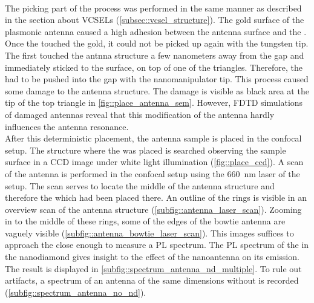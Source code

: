 					\\
					The picking part of the \pp process was performed in the same manner as described in the section about VCSELs (\cref{subsec::vcsel_structure}).
					The gold surface of the plasmonic antenna caused a high adhesion between the antenna surface and the \nd.
					Once the \nd touched the gold, it could not be picked up again with the tungsten tip.
					The \nd first touched the antnna structure a few nanometers away from the gap and immediately sticked to the surface, on top of one of the triangles.
					Therefore, the \nd had to be pushed into the gap with the nanomanipulator tip.
					This process caused some damage to the antenna structure.
					The damage is visible as black area at the tip of the top triangle in \cref{fig::place_antenna_sem}.
					However, FDTD simulations of damaged antennas reveal that this modification of the antenna hardly influences the antenna resonance.
					\\
					After this deterministic placement, the antenna sample is placed in the confocal setup.
					The structure where the \nd was placed is searched observing the sample surface in a CCD image under white light illumination (\cref{fig::place_ccd}).
					A scan of the antenna is performed in the confocal setup using the \SI{660}{nm} \cw laser of the setup.
					The scan serves to locate the middle of the antenna structure and therefore the \nd which had been placed there.
					An outline of the rings is visible in an overview scan of the antenna structure (\cref{subfig::antenna_laser_scan}).
					Zooming in to the middle of these rings, some of the edges of the bowtie antenna are vaguely visible (\cref{subfig::antenna_bowtie_laser_scan}).
					This images suffices to approach the \nd close enough to measure a PL spectrum.
					The PL spectrum of the \siv in the nanodiamond gives insight to the effect of the nanoantenna on its emission.
					The result is displayed in \cref{subfig::spectrum_antenna_nd_multiple}.
					To rule out artifacts, a spectrum of an antenna of the same dimensions without \nd is recorded (\cref{subfig::spectrum_antenna_no_nd}).
